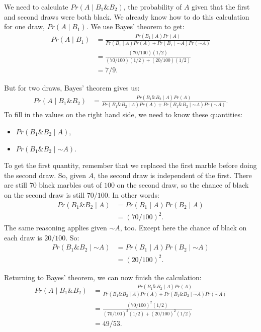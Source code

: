 \documentclass[justified]{tufte-book}
\providecommand{\tightlist}{%
  \setlength{\itemsep}{0pt}\setlength{\parskip}{0pt}}
\newcommand{\given}{\mid}
\renewcommand{\neg}{\mathbin{\sim}}
\renewcommand{\wedge}{\mathbin{\&}}
\newcommand{\p}{Pr}
\theoremstyle{definition}
\theoremstyle{definition}
\theoremstyle{definition}
\theoremstyle{remark}
\begin{document}
We need to calculate \(\p(A \given B_1 \wedge B_2)\), the probability of
\(A\) given that the first and second draws were both black. We already
know how to do this calculation for one draw, \(\p(A \given B_1)\). We
use Bayes' theorem to get: \[
  \begin{aligned}
    \p(A \given B_1) &= \frac{\p(B_1 \given A)\p(A)}{\p(B_1 \given A) \p(A) + \p(B_1 \given \neg A) \p(\neg A)} \\
      &= \frac{(70/100)(1/2)}{(70/100)(1/2) + (20/100)(1/2)}\\
      &= 7/9.
  \end{aligned}
\]

But for two draws, Bayes' theorem gives us: \[
  \begin{aligned}
    \p(A \given B_1 \wedge B_2) &= \frac{\p(B_1 \wedge B_2 \given A)\p(A)}{\p(B_1 \wedge B_2 \given A) \p(A) + \p(B_1 \wedge B_2 \given \neg A) \p(\neg A)}.
  \end{aligned}
\] To fill in the values on the right hand side, we need to know these
quantities:

\begin{itemize}
\tightlist
\item
  \(\p(B_1 \wedge B_2 \given A)\),
\item
  \(\p(B_1 \wedge B_2 \given \neg A)\).
\end{itemize}

To get the first quantity, remember that we replaced the first marble
before doing the second draw. So, given \(A\), the second draw is
independent of the first. There are still \(70\) black marbles out of
\(100\) on the second draw, so the chance of black on the second draw is
still \(70/100\). In other words: \[
  \begin{aligned}
    \p(B_1 \wedge B_2 \given A) &= \p(B_1 \given A) \p(B_2 \given A)\\
      &= (70/100)^2.
  \end{aligned}
\] The same reasoning applies given \(\neg A\), too. Except here the
chance of black on each draw is \(20/100\). So: \[
  \begin{aligned}
    \p(B_1 \wedge B_2 \given \neg A) &= \p(B_1 \given A) \p(B_2 \given \neg A)\\
      &= (20/100)^2.
  \end{aligned}
\]

Returning to Bayes' theorem, we can now finish the calculation: \[
  \begin{aligned}
    \p(A \given B_1 \wedge B_2) &= \frac{\p(B_1 \wedge B_2 \given A)\p(A)}{\p(B_1 \wedge B_2 \given A) \p(A) + \p(B_1 \wedge B_2 \given \neg A) \p(\neg A)} \\ 
    &= \frac{(70/100)^2(1/2)}{(70/100)^2(1/2) + (20/100)^2(1/2)}\\
    &= 49/53.
  \end{aligned}
\]
\end{document}
